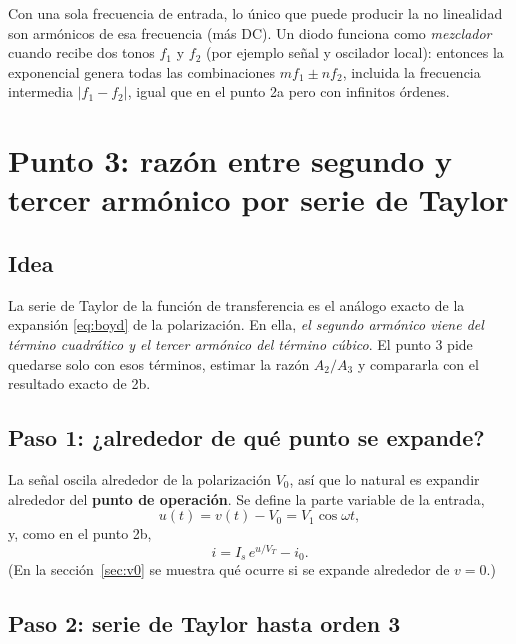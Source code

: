 \documentclass[11pt,letterpaper]{article}
\newcommand{\VT}{V_T}
\begin{document}
\begin{cuidado}
Con una sola frecuencia de entrada, lo único que puede producir la no linealidad son armónicos de esa
frecuencia (más DC). Un diodo funciona como \emph{mezclador} cuando recibe dos tonos $f_1$ y $f_2$ (por ejemplo
señal y oscilador local): entonces la exponencial genera todas las combinaciones $mf_1\pm nf_2$, incluida la
frecuencia intermedia $|f_1-f_2|$, igual que en el punto 2a pero con infinitos órdenes.
\end{cuidado}

\section{Punto 3: razón entre segundo y tercer armónico por serie de Taylor}

\subsection{Idea}

La serie de Taylor de la función de transferencia es el análogo exacto de la expansión
\eqref{eq:boyd} de la polarización. En ella, \emph{el segundo armónico viene del término cuadrático y el
tercer armónico del término cúbico}. El punto 3 pide quedarse solo con esos términos, estimar la razón
$A_2/A_3$ y compararla con el resultado exacto de 2b.

\subsection{Paso 1: ¿alrededor de qué punto se expande?}

La señal oscila alrededor de la polarización $V_0$, así que lo natural es expandir alrededor del
\textbf{punto de operación}. Se define la parte variable de la entrada,
\begin{equation}
  u(t)=v(t)-V_0=V_1\cos\omega t,
\end{equation}
y, como en el punto 2b,
\begin{equation}
  i=I_s\,e^{u/\VT}-i_0 .
\end{equation}
(En la sección~\ref{sec:v0} se muestra qué ocurre si se expande alrededor de $v=0$.)

\subsection{Paso 2: serie de Taylor hasta orden 3}
\end{document}
